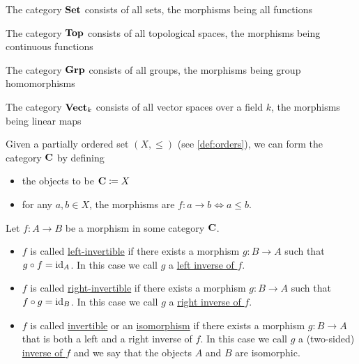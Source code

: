 \begin{definition}\label{def:standard_categories}
  \begin{defenum}
    \item\label{def:standard_categories/set} The category $\operatorname{\mathbf{Set}}$ consists of all sets, the morphisms being all functions
    \item\label{def:standard_categories/top} The category $\operatorname{\mathbf{Top}}$ consists of all topological spaces, the morphisms being continuous functions
    \item\label{def:standard_categories/grp} The category $\operatorname{\mathbf{Grp}}$ consists of all groups, the morphisms being group homomorphisms
    \item\label{def:standard_categories/vect} The category $\operatorname{\mathbf{Vect}}_k$ consists of all vector spaces over a field $k$, the morphisms being linear maps
    \item\label{def:standard_categories/ord} Given a partially ordered set $(X, \leq)$ (see \cref{def:orders}), we can form the category $\operatorname{\mathbf{C}}$ by defining
    \begin{itemize}
      \item the objects to be $\operatorname{\mathbf{C}} \coloneqq X$
      \item for any $a, b \in X$, the morphisms are $f: a \to b \iff a \leq b$.
    \end{itemize}
  \end{defenum}
\end{definition}

\begin{definition}\label{def:morphism_invertability}
  Let $f: A \to B$ be a morphism in some category $\operatorname{\mathbf{C}}$.

  \begin{itemize}
    \item $f$ is called \uline{left-invertible} if there exists a morphism $g: B \to A$ such that $g \circ f = \operatorname{id}_A$. In this case we call $g$ a \uline{left inverse of $f$}.

    \item $f$ is called \uline{right-invertible} if there exists a morphism $g: B \to A$ such that $f \circ g = \operatorname{id}_B$. In this case we call $g$ a \uline{right inverse of $f$}.

    \item $f$ is called \uline{invertible} or an \uline{isomorphism} if there exists a morphism $g: B \to A$ that is both a left and a right inverse of $f$. In this case we call $g$ a (two-sided) \uline{inverse of $f$} and we say that the objects $A$ and $B$ are isomorphic.
  \end{itemize}
\end{definition}

